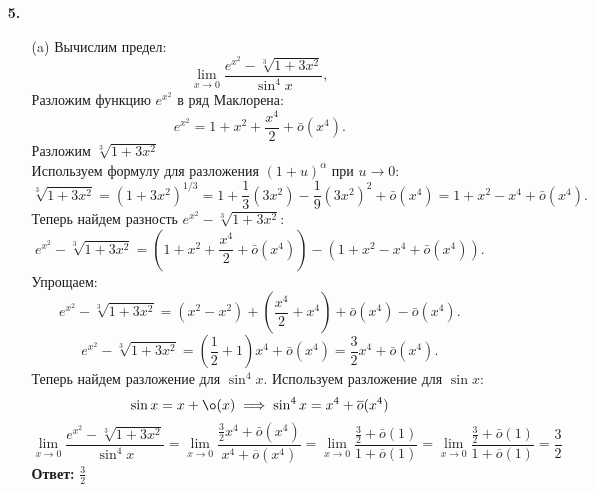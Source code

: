 \documentclass[a4paper]{article}
\renewcommand{\f}[2]{\frac{#1}{#2}}
\newcommand{\oo}{\overline{o}}
\begin{document}
\begin{enumerate}
    \item[\textbf{5.}]
    \begin{enumerate}
        \item[(a)]Вычислим предел:
        $$
        \lim_{x \rightarrow 0} \frac{e^{x^{2}} - \sqrt[3]{1 + 3x^{2}}}{\sin^{4} x},
        $$
        Разложим функцию $ e^{x^2} $ в ряд Маклорена:
        $$
        e^{x^2} = 1 + x^2 + \frac{x^4}{2} + \bar{o}(x^4).
        $$
        Разложим $ \sqrt[3]{1 + 3x^2} $\\
        Используем формулу для разложения $ (1 + u)^{\alpha} $ при $ u \to 0 $:
        $$
        \sqrt[3]{1 + 3x^2} = (1 + 3x^2)^{1/3} = 1 + \frac{1}{3}(3x^2) - \frac{1}{9}(3x^2)^2 + \bar{o}(x^4) = 1 + x^2 - x^4 + \bar{o}(x^4).
        $$
        Теперь найдем разность $ e^{x^2} - \sqrt[3]{1 + 3x^2} $:
        $$
        e^{x^2} - \sqrt[3]{1 + 3x^2} = \left(1 + x^2 + \frac{x^4}{2} + \bar{o}(x^4)\right) - \left(1 + x^2 - x^4 + \bar{o}(x^4)\right).
        $$
        Упрощаем:
        $$
        e^{x^2} - \sqrt[3]{1 + 3x^2} = \left(x^2 - x^2\right) + \left(\frac{x^4}{2} + x^4\right) + \bar{o}(x^4) - \bar{o}(x^4).
        $$
        $$
        e^{x^2} - \sqrt[3]{1 + 3x^2} = \left(\frac{1}{2} + 1\right)x^4 + \bar{o}(x^4) = \frac{3}{2}x^4 + \bar{o}(x^4).
        $$  
        Теперь найдем разложение для $ \sin^4 x $. Используем разложение для $ \sin x $:
        $$
        \sin x = x + \o(x) \implies \sin^4{x} = x^4 + \oo(x^4)
        $$
        $$
        \lim_{x \rightarrow 0} \frac{e^{x^{2}} - \sqrt[3]{1 + 3x^{2}}}{\sin^{4} x} =  \lim_{x \rightarrow 0}\f{\frac{3}{2}x^4 + \bar{o}(x^4)}{x^4 + \oo(x^4)} = \lim_{x \rightarrow 0}\f{\frac{3}{2} + \bar{o}(1)}{1 + \oo(1)} = \lim_{x \rightarrow 0}\f{\frac{3}{2} + \bar{o}(1)}{1 + \oo(1)} = \f{3}{2}
        $$
        \textbf{Ответ: }$\f{3}{2}$\\


\end{enumerate}
\end{enumerate}
\end{document}
